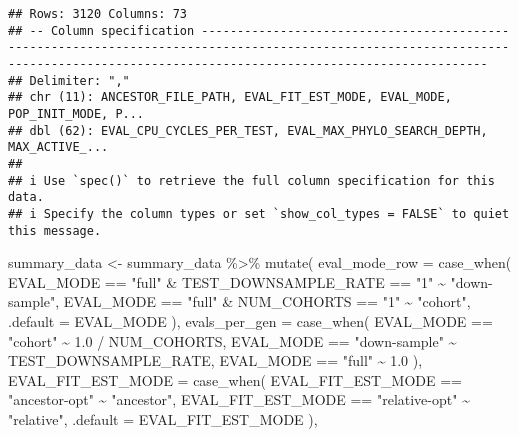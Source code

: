 \documentclass[
]{book}
\newenvironment{Shaded}{\begin{snugshade}}{\end{snugshade}}
\newcommand{\AttributeTok}[1]{\textcolor[rgb]{0.77,0.63,0.00}{#1}}
\newcommand{\FloatTok}[1]{\textcolor[rgb]{0.00,0.00,0.81}{#1}}
\newcommand{\FunctionTok}[1]{\textcolor[rgb]{0.00,0.00,0.00}{#1}}
\newcommand{\NormalTok}[1]{#1}
\newcommand{\OtherTok}[1]{\textcolor[rgb]{0.56,0.35,0.01}{#1}}
\newcommand{\SpecialCharTok}[1]{\textcolor[rgb]{0.00,0.00,0.00}{#1}}
\newcommand{\StringTok}[1]{\textcolor[rgb]{0.31,0.60,0.02}{#1}}
\begin{document}
\begin{verbatim}
## Rows: 3120 Columns: 73
## -- Column specification ------------------------------------------------------------------------------------------------------------------------------------------------------------------------------------
## Delimiter: ","
## chr (11): ANCESTOR_FILE_PATH, EVAL_FIT_EST_MODE, EVAL_MODE, POP_INIT_MODE, P...
## dbl (62): EVAL_CPU_CYCLES_PER_TEST, EVAL_MAX_PHYLO_SEARCH_DEPTH, MAX_ACTIVE_...
## 
## i Use `spec()` to retrieve the full column specification for this data.
## i Specify the column types or set `show_col_types = FALSE` to quiet this message.
\end{verbatim}

\begin{Shaded}
\begin{Highlighting}[]
\NormalTok{summary\_data }\OtherTok{\textless{}{-}}\NormalTok{ summary\_data }\SpecialCharTok{\%\textgreater{}\%}
  \FunctionTok{mutate}\NormalTok{(}
    \AttributeTok{eval\_mode\_row =} \FunctionTok{case\_when}\NormalTok{(}
\NormalTok{      EVAL\_MODE }\SpecialCharTok{==} \StringTok{"full"} \SpecialCharTok{\&}\NormalTok{ TEST\_DOWNSAMPLE\_RATE }\SpecialCharTok{==} \StringTok{"1"} \SpecialCharTok{\textasciitilde{}} \StringTok{"down{-}sample"}\NormalTok{,}
\NormalTok{      EVAL\_MODE }\SpecialCharTok{==} \StringTok{"full"} \SpecialCharTok{\&}\NormalTok{ NUM\_COHORTS }\SpecialCharTok{==} \StringTok{"1"} \SpecialCharTok{\textasciitilde{}} \StringTok{"cohort"}\NormalTok{,}
      \AttributeTok{.default =}\NormalTok{ EVAL\_MODE}
\NormalTok{    ),}
    \AttributeTok{evals\_per\_gen =} \FunctionTok{case\_when}\NormalTok{(}
\NormalTok{      EVAL\_MODE }\SpecialCharTok{==} \StringTok{"cohort"} \SpecialCharTok{\textasciitilde{}} \FloatTok{1.0} \SpecialCharTok{/}\NormalTok{ NUM\_COHORTS,}
\NormalTok{      EVAL\_MODE }\SpecialCharTok{==} \StringTok{"down{-}sample"} \SpecialCharTok{\textasciitilde{}}\NormalTok{ TEST\_DOWNSAMPLE\_RATE,}
\NormalTok{      EVAL\_MODE }\SpecialCharTok{==} \StringTok{"full"} \SpecialCharTok{\textasciitilde{}} \FloatTok{1.0}
\NormalTok{    ),}
    \AttributeTok{EVAL\_FIT\_EST\_MODE =} \FunctionTok{case\_when}\NormalTok{(}
\NormalTok{      EVAL\_FIT\_EST\_MODE }\SpecialCharTok{==} \StringTok{"ancestor{-}opt"} \SpecialCharTok{\textasciitilde{}} \StringTok{"ancestor"}\NormalTok{,}
\NormalTok{      EVAL\_FIT\_EST\_MODE }\SpecialCharTok{==} \StringTok{"relative{-}opt"} \SpecialCharTok{\textasciitilde{}} \StringTok{"relative"}\NormalTok{,}
      \AttributeTok{.default =}\NormalTok{ EVAL\_FIT\_EST\_MODE}
\NormalTok{    ),}

\end{Highlighting}
\end{Shaded}
\end{document}
